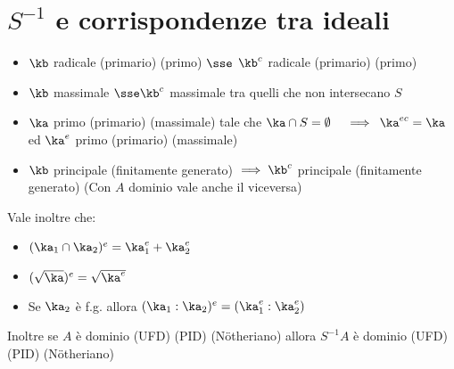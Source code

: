 \documentclass[a4paper,NoNotes,GeneralMath]{stdmdoc}
\begin{document}
	\section*{$S^{-1}$ e corrispondenze tra ideali}
	\begin{itemize}
		\item $\kb$ radicale (primario) (primo) $\sse$ $\kb^c$ radicale (primario) (primo)
		\item $\kb$ massimale $\sse \kb^c$ massimale tra quelli che non intersecano $S$
		\item $\ka$ primo (primario) (massimale) tale che $\ka \cap S = \emptyset \quad \implies$ $\ka^{ec} = \ka$ ed $\ka^e$ primo (primario) (massimale)
		\item $\kb$ principale (finitamente generato) $\implies \kb^c$ principale (finitamente generato) (Con $A$ dominio vale anche il viceversa)
	\end{itemize}
	Vale inoltre che:
	\begin{itemize}
		\item $(\ka_1 \cap \ka_2)^e = \ka_1^e + \ka_2^e$
		\item $(\sqrt{\ka})^e = \sqrt{\ka^e}$
		\item Se $\ka_2$ è f.g. allora $(\ka_1 : \ka_2)^e = (\ka_1^e : \ka_2^e)$
	\end{itemize}
	Inoltre se $A$ è dominio (UFD) (PID) (Nötheriano) allora $S^{-1}A$ è dominio (UFD) (PID) (Nötheriano)
\end{document}
